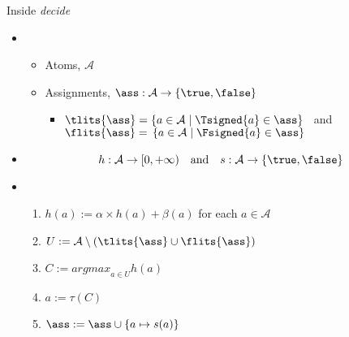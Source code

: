 \begin{frame}{Inside \alert<1>{\textit{decide}}}
  \bigskip
  \begin{itemize}
  \item<2-> 
    \begin{itemize}
    \item Atoms, $\mathcal{A}$
    \item Assignments, $\ass: \mathcal{A}\to\{\true,\false\}$
      \begin{itemize}
      \item[]
        $\tlits{\ass}=\{a\in\mathcal{A}\mid\Tsigned{a}\in\ass\}$ \ and \
        $\flits{\ass}=\,\{a\in\mathcal{A}\mid\Fsigned{a}\in\ass\}$
      \end{itemize}
    \end{itemize}
  \item<3-> 
    \[
    h: \mathcal{A}\to[0,+\infty)
    \quad\text{and}\quad
    s: \mathcal{A}\to\{\true,\false\}
    \]
  \item<4-> 
  \medskip
    \begin{enumerate}
    \item $h(a) := \alpha\times h(a) + \beta(a)$ \hfill for each $a\in\mathcal{A}\qquad$
    \item $U:=\mathcal{A}\setminus (\tlits{\ass}\cup\flits{\ass})$
    \item $C:= \textit{argmax}_{a\in U}h(a)$
    \item $a:= \tau(C)$
    \item $\ass := \ass\cup\{a\mapsto s(a)\}$
    \end{enumerate}
  \end{itemize}
\end{frame}

